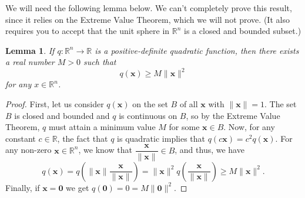 \documentclass[12pt,letterpaper]{article}
\newtheorem{lemma}[theorem]{Lemma}
\newcommand{\R}{\mathbb{R}}
\newcommand{\x}{\mathbf{x}}
\begin{document}
We will need the following lemma below. We can't completely prove this result, since it relies on the Extreme Value Theorem, which we will not prove. (It also requires you to accept that the unit sphere in $\R^n$ is a closed and bounded subset.)
\begin{lemma}\label{l1}
If $q:\R^n\to \R$ is a positive-definite quadratic function, then there exists a real number $M>0$ such that
\[
q(\x)\geq M\lVert\x\rVert^2
\]
for any $x\in\R^n$.
\end{lemma}
\begin{proof}
First, let us consider $q(\x)$ on the set $B$ of all $\x$ with $\lVert \x\rVert = 1$. The set $B$ is closed and bounded and $q$ is continuous on $B$, so by the Extreme Value Theorem, $q$ must attain a minimum value $M$ for some $\x\in B$. Now, for any constant $c\in\R$, the fact that $q$ is quadratic implies that $q(c\x) = c^2q(\x)$. For any non-zero $\x\in \R^n$, we know that $\dfrac{\x}{\lVert\x\rVert}\in B$, and thus, we have
\[
q(\x) = q\left(\lVert\x\rVert\frac{\x}{\lVert\x\rVert}\right)=\lVert\x\rVert^2q\left(\frac{\x}{\lVert\x\rVert}\right)\geq M\lVert\x\rVert^2.
\]
Finally, if $\x=\mathbf{0}$ we get $q(\mathbf{0})=0=M\lVert\mathbf{0}\rVert^2$.
\end{proof}
\end{document}
